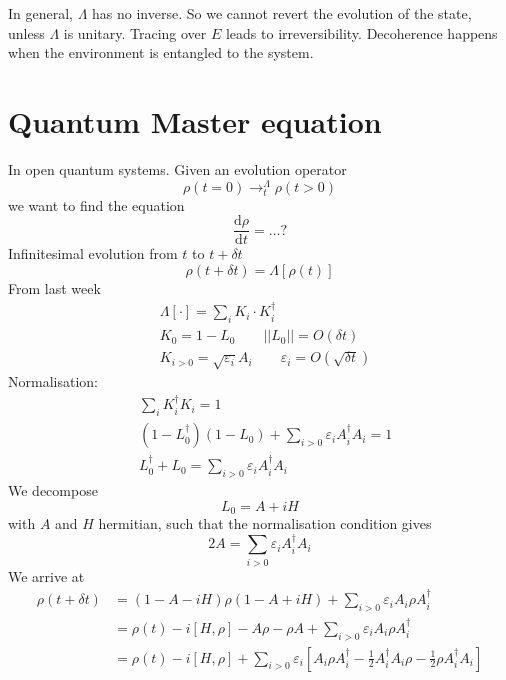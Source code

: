 \documentclass[a4paper]{book}
\theoremstyle{definition}
\theoremstyle{remark}
\begin{document}
In general, $\Lambda$ has no inverse. So we cannot revert the evolution of the state, unless $\Lambda$ is unitary. Tracing over $E$ leads to irreversibility. Decoherence happens when the environment is entangled to the system. 

\chapter{Quantum Master equation}

In open quantum systems. Given an evolution operator 
\begin{equation}
    \rho(t = 0) \rightarrow^{\Lambda}_t \rho(t > 0)
\end{equation}
we want to find the equation 
\begin{equation}
    \frac{\text{d}\rho}{\text{d}t} = \dots ?
\end{equation}
Infinitesimal evolution from $t$ to $t+\delta t$
\begin{equation}
    \rho(t + \delta t) = \Lambda[\rho(t)]
\end{equation}
From last week 
\begin{equation}
    \begin{aligned}
        &\Lambda[\cdot] = \sum_i K_i \cdot K_i^\dagger \\
        &K_0 = 1 - L_0 \qquad ||L_0|| = O(\delta t) \\
        &K_{i>0} = \sqrt{\varepsilon_i} A_i \qquad \varepsilon_i = O(\sqrt{\delta t})
    \end{aligned}
\end{equation}
Normalisation:
\begin{equation}
    \begin{aligned}
        &\sum_i K_i^\dagger K_i = 1 \\
        &(1 - L_0^\dagger)(1 - L_0) + \sum_{i>0}\varepsilon_i A^\dagger_i A_i = 1 \\
        &L_0^\dagger  + L_0 = \sum_{i>0} \varepsilon_i A_i^\dagger A_i 
    \end{aligned}
\end{equation} 
We decompose 
\begin{equation}
    L_0 = A + iH
\end{equation}
with $A$ and $H$ hermitian, such that the normalisation condition gives 
\begin{equation}
    2A= \sum_{i>0} \varepsilon_i A_i^\dagger A_i 
\end{equation}
We arrive at 
\begin{equation}
    \begin{aligned}
        \rho(t + \delta t) &= (1 - A - iH)\rho (1 - A + iH) + \sum_{i>0} \varepsilon_i A_i \rho A_i^\dagger \\
        &= \rho(t) - i[H, \rho] - A\rho - \rho A + \sum_{i>0} \varepsilon_i A_i \rho A_i^\dagger \\ 
        &= \rho(t) - i[H, \rho] + \sum_{i>0} \varepsilon_i \left[A_i \rho A_i^\dagger - \frac{1}{2}A_i^\dagger A_i \rho - \frac{1}{2}\rho A_i^\dagger A_i \right] 
    \end{aligned}
\end{equation}
\end{document}
